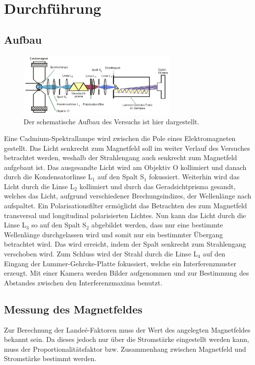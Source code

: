 \section{Durchführung}
\label{sec:Durchfuehrung}
\subsection{Aufbau}
    \begin{figure}[h]
        \center
        \includegraphics[width=0.7\textwidth]{bilder/aufbau.jpeg}
        \caption{Der schematische Aufbau des Versuchs ist hier dargestellt. \cite{tu_dortmund_versuchsanleitung_2021}}
        \label{fig:aufbau}
    \end{figure}
    \FloatBarrier

    Eine Cadmium-Spektrallampe wird zwischen die Pole eines Elektromagneten gestellt.
    Das Licht senkrecht zum Magnetfeld soll im weiter Verlauf des Versuches betrachtet werden, weshalb der Strahlengang auch senkrecht zum Magnetfeld aufgebaut ist.
    Das ausgesandte Licht wird am Objektiv O kollimiert und danach durch die Kondensatorlinse L$_1$ auf den Spalt S$_1$ fokussiert.
    Weiterhin wird das Licht durch die Linse L$_2$ kollimiert und durch das Geradsichtprisma gesandt, welches das Licht, aufgrund verschiedener Brechungsindizes, der Wellenlänge nach aufspaltet.
    Ein Polarisationsfilter ermöglicht das Betrachten des zum Magnetfeld transversal und longitudinal polarisierten Lichtes.
    Nun kann das Licht durch die Linse L$_3$ so auf den Spalt S$_2$ abgebildet werden, dass nur eine bestimmte Wellenlänge durchgelassen wird und somit nur ein bestimmter Übergang betrachtet wird.
    Das wird erreicht, indem der Spalt senkrecht zum Strahlengang verschoben wird.
    Zum Schluss wird der Strahl durch die Linse L$_4$ auf den Eingang der Lummer-Gehrcke-Platte fokussiert, welche ein Interferenzmuster erzeugt.
    Mit einer Kamera werden Bilder aufgenommen und zur Bestimmung des Abstandes zwischen den Interferenzmaxima benutzt.

\subsection{Messung des Magnetfeldes}
\label{sec:BFeld}
    Zur Berechnung der Landeé-Faktoren muss der Wert des angelegten Magnetfeldes bekannt sein.
    Da dieses jedoch nur über die Stromstärke eingestellt werden kann, muss der Proportionalitätsfaktor bzw. Zusammenhang zwischen Magnetfeld und Stromstärke bestimmt werden.

